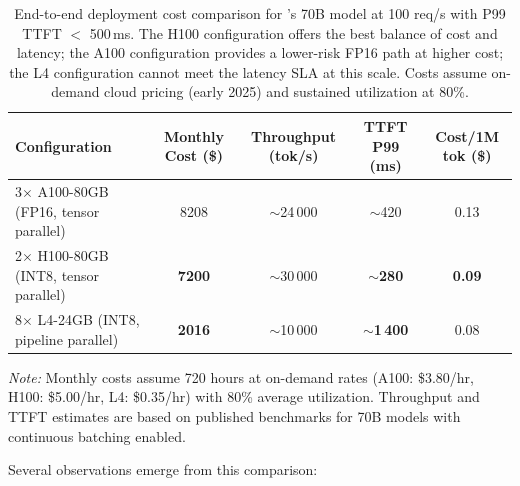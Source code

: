 \begin{table}[t]
\centering
\small
\caption{End-to-end deployment cost comparison for \ishtar{}'s 70B model at 100 req/s with P99 TTFT $<$ 500\,ms. The H100 configuration offers the best balance of cost and latency; the A100 configuration provides a lower-risk FP16 path at higher cost; the L4 configuration cannot meet the latency SLA at this scale. Costs assume on-demand cloud pricing (early 2025) and sustained utilization at 80\%.}
\label{tab:ch03_e2e_cost}
\setlength{\tabcolsep}{5pt}
\renewcommand{\arraystretch}{1.3}
\begin{tabularx}{\linewidth}{@{}>{\raggedright\arraybackslash}p{28mm} S[table-format=4.0] S[table-format=5.0] S[table-format=4.0] S[table-format=1.2]@{}}
\toprule
{}
\textbf{Configuration} & {\textbf{Monthly Cost (\$)}} & {\textbf{Throughput (tok/s)}} & {\textbf{TTFT P99 (ms)}} & {\textbf{Cost/1M tok (\$)}} \\
\midrule
{}
3$\times$ A100-80GB (FP16, tensor parallel) &
8208 &
{$\sim$24\,000} &
{$\sim$420} &
0.13 \\
\addlinespace[2pt]
2$\times$ H100-80GB (INT8, tensor parallel) &
\textcolor{green!70!black}{\textbf{7200}} &
{$\sim$30\,000} &
{\textcolor{green!70!black}{\textbf{$\sim$280}}} &
\textcolor{green!70!black}{\textbf{0.09}} \\
\addlinespace[2pt]
8$\times$ L4-24GB (INT8, pipeline parallel) &
\textcolor{blue!70!black}{\textbf{2016}} &
{$\sim$10\,000} &
{\textcolor{red!70!black}{\textbf{$\sim$1\,400}}} &
0.08 \\
\bottomrule
\end{tabularx}
\vspace{3pt}
\footnotesize
\textit{Note:} Monthly costs assume 720 hours at on-demand rates (A100: \$3.80/hr, H100: \$5.00/hr, L4: \$0.35/hr) with 80\% average utilization. Throughput and TTFT estimates are based on published benchmarks for 70B models with continuous batching enabled.
\end{table}

Several observations emerge from this comparison:

